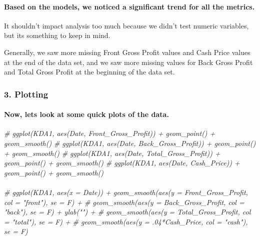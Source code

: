 \documentclass[
]{article}
\newenvironment{Shaded}{\begin{snugshade}}{\end{snugshade}}
\newcommand{\CommentTok}[1]{\textcolor[rgb]{0.56,0.35,0.01}{\textit{#1}}}
\begin{document}
\hypertarget{based-on-the-models-we-noticed-a-significant-trend-for-all-the-metrics.}{%
\paragraph{Based on the models, we noticed a significant trend for all
the
metrics.}\label{based-on-the-models-we-noticed-a-significant-trend-for-all-the-metrics.}}

It shouldn't impact analysis too much because we didn't test numeric
variables, but its something to keep in mind.

Generally, we saw more missing Front Gross Profit values and Cash Price
values at the end of the data set, and we saw more missing values for
Back Gross Profit and Total Gross Profit at the beginning of the data
set.

\hypertarget{plotting}{%
\subsubsection{3. Plotting}\label{plotting}}

\hypertarget{now-lets-look-at-some-quick-plots-of-the-data.}{%
\paragraph{Now, lets look at some quick plots of the
data.}\label{now-lets-look-at-some-quick-plots-of-the-data.}}

\begin{Shaded}
\begin{Highlighting}[]
\CommentTok{\# ggplot(KDA1, aes(Date, Front\_Gross\_Profit)) + geom\_point() + geom\_smooth()}
\CommentTok{\# ggplot(KDA1, aes(Date, Back\_Gross\_Profit)) + geom\_point() + geom\_smooth()}
\CommentTok{\# ggplot(KDA1, aes(Date, Total\_Gross\_Profit)) + geom\_point() + geom\_smooth()}
\CommentTok{\# ggplot(KDA1, aes(Date, Cash\_Price)) + geom\_point() + geom\_smooth()}
\end{Highlighting}
\end{Shaded}

\hypertarget{section}{%
\paragraph{}\label{section}}

\begin{Shaded}
\begin{Highlighting}[]
\CommentTok{\# ggplot(KDA1, aes(x = Date)) + geom\_smooth(aes(y = Front\_Gross\_Profit, col = "front"), se = F) +}
\CommentTok{\#   geom\_smooth(aes(y = Back\_Gross\_Profit, col = "back"), se = F) + ylab("") +}
\CommentTok{\#   geom\_smooth(aes(y = Total\_Gross\_Profit, col = "total"), se = F) +}
\CommentTok{\#   geom\_smooth(aes(y = .04*Cash\_Price, col = "cash"), se = F) }
\end{Highlighting}
\end{Shaded}
\end{document}

